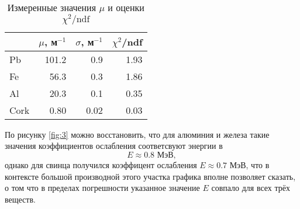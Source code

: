 \begin{table}[ht]
    \centering
    \caption{Измеренные значения $\mu$ и оценки $\chi^2/\text{ndf}$}
\begin{tabular}{lrrr}
\toprule
    &  $\mu$, м$^{-1}$ &  $\sigma$, м$^{-1}$ &  $\chi^2$/ndf \\
\midrule
  Pb &  101.2 &       0.9 &      1.93 \\
  Fe &   56.3 &       0.3 &      1.86 \\
  Al &   20.3 &       0.1 &      0.35 \\
Cork &    0.80 &       0.02 &      0.03 \\
\bottomrule
\end{tabular}
\label{tab:2}
\end{table}


По рисунку \ref{fig:3} можно восстановить, что для алюминия и железа такие значения коэффициентов ослабления соответсвуют энергии в 
\begin{equation*}
    E \approx 0.8 \text{ МэВ},
\end{equation*}
однако для свинца получился коэффицент ослабления $E \approx 0.7$ МэВ, что в контексте большой производной этого участка графика вполне позволяет сказать,  о том что в пределах погрешности указанное значение $E$ совпало для всех трёх веществ.

